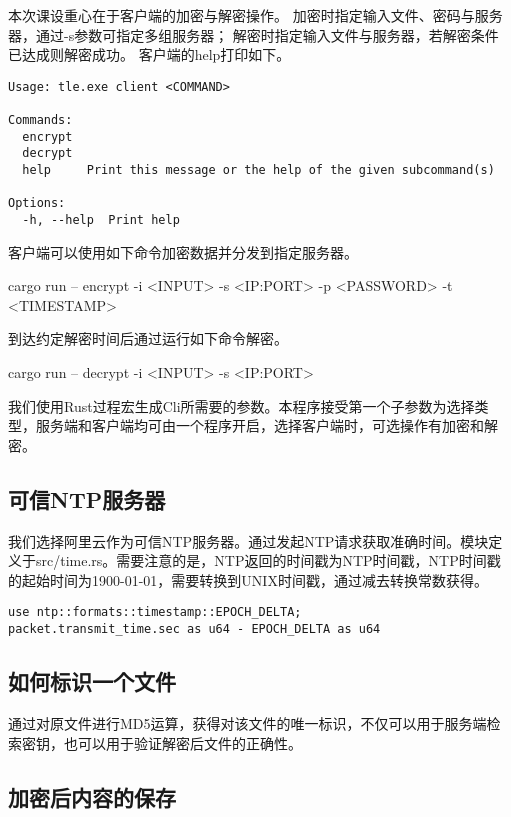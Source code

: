 \documentclass{ctexart}
\begin{document}
本次课设重心在于客户端的加密与解密操作。
加密时指定输入文件、密码与服务器，通过-s参数可指定多组服务器；
解密时指定输入文件与服务器，若解密条件已达成则解密成功。
客户端的help打印如下。

\begin{lstlisting}
Usage: tle.exe client <COMMAND>

Commands:
  encrypt
  decrypt
  help     Print this message or the help of the given subcommand(s)

Options:
  -h, --help  Print help
\end{lstlisting}

客户端可以使用如下命令加密数据并分发到指定服务器。
\begin{center}
cargo run -- encrypt -i <INPUT> -s <IP:PORT> -p <PASSWORD> -t <TIMESTAMP>
\end{center}

到达约定解密时间后通过运行如下命令解密。
\begin{center}
cargo run -- decrypt -i <INPUT> -s <IP:PORT>
\end{center}

我们使用Rust过程宏生成Cli所需要的参数。本程序接受第一个子参数为选择类型，服务端和客户端均可由一个程序开启，选择客户端时，可选操作有加密和解密。

\subsection{可信NTP服务器}

我们选择阿里云作为可信NTP服务器。通过发起NTP请求获取准确时间。模块定义于src/time.rs。需要注意的是，NTP返回的时间戳为NTP时间戳，NTP时间戳的起始时间为1900-01-01，需要转换到UNIX时间戳，通过减去转换常数获得。

\begin{lstlisting}
use ntp::formats::timestamp::EPOCH_DELTA;
packet.transmit_time.sec as u64 - EPOCH_DELTA as u64
\end{lstlisting}

\subsection{如何标识一个文件}

通过对原文件进行MD5运算，获得对该文件的唯一标识，不仅可以用于服务端检索密钥，也可以用于验证解密后文件的正确性。

\subsection{加密后内容的保存}
\end{document}
